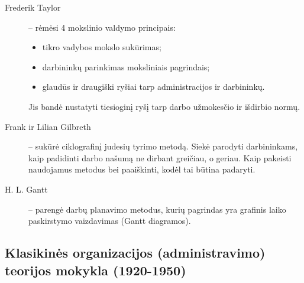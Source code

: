 \begin{description}
  \item[Frederik Taylor] – rėmėsi 4 mokslinio valdymo principais:
    \begin{itemize}
      \item tikro vadybos mokslo sukūrimas;
      \item darbininkų parinkimas moksliniais pagrindais;
      \item glaudūs ir draugiški ryšiai tarp administracijos ir
        darbininkų.
    \end{itemize}
    Jis bandė nustatyti tiesioginį ryšį tarp darbo užmokesčio ir išdirbio
    normų.
  \item[Frank ir Lilian Gilbreth] – sukūrė ciklografinį judesių tyrimo
    metodą. Siekė parodyti darbininkams, kaip padidinti darbo našumą
    ne dirbant greičiau, o geriau. Kaip pakeisti naudojamus metodus
    bei paaiškinti, kodėl tai būtina padaryti.
  \item[H. L. Gantt] – parengė darbų planavimo metodus, kurių pagrindas
    yra grafinis laiko paskirstymo vaizdavimas (Gantt diagramos).
\end{description}

\subsection{Klasikinės organizacijos (administravimo) teorijos mokykla
(1920-1950)}

